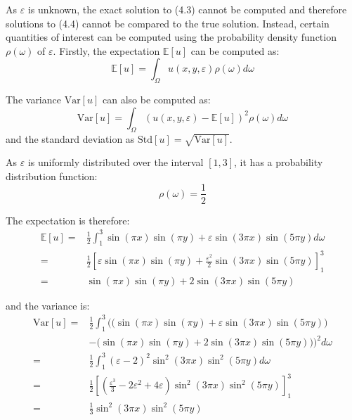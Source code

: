 \documentclass{article}
\numberwithin{equation}{section}
\begin{document}
As $\varepsilon$ is unknown, the exact solution to (4.3) cannot be computed and therefore solutions to (4.4) cannot be compared to the true solution. Instead, certain quantities of interest can be computed using the probability density function $\rho(\omega)$ of $\varepsilon$. Firstly, the expectation $\mathbb{E}[u]$ can be computed as:
\begin{equation}
\mathbb{E}[u] = \int_{\Omega} u(x,y,\varepsilon) \rho(\omega) d \omega
\end{equation}

The variance $\text{Var}[u]$ can also be computed as:
\begin{equation}
\text{Var}[u] = \int_{\Omega} \left(u(x,y,\varepsilon) - \mathbb{E}[u] \right)^2 \rho(\omega) d \omega
\end{equation}
and the standard deviation as $\text{Std}[u] = \sqrt{\text{Var}[u]}$.

As $\varepsilon$ is uniformly distributed over the interval $[1,3]$, it has a probability distribution function:
\begin{equation}
\rho(\omega) = \frac{1}{2}
\end{equation}

The expectation is therefore:
\begin{equation}
\begin{split}
\mathbb{E}[u] = & \frac{1}{2} \int_{1}^3 \sin(\pi x)\sin(\pi y) + \varepsilon \sin(3 \pi x) \sin(5 \pi y) d \omega \\
= & \frac{1}{2} \left[\varepsilon \sin(\pi x) \sin(\pi y) + \frac{\varepsilon^2}{2} \sin(3 \pi x) \sin(5 \pi y)\right]_{1}^{3} \\
= & \sin(\pi x) \sin(\pi y) + 2 \sin(3\pi x)\sin(5\pi y)
\end{split}
\end{equation}

and the variance is:
\begin{equation}
\begin{split}
\text{Var}[u] = & \frac{1}{2} \int_{1}^3 \Big( \big( \sin(\pi x) \sin(\pi y) + \varepsilon \sin(3 \pi x) \sin(5 \pi y) \big) \\
& - \big(\sin(\pi x) \sin(\pi y) + 2\sin(3\pi x)\sin(5\pi y) \big) \Big)^2 d \omega \\
= & \frac{1}{2} \int_{1}^3 (\varepsilon-2)^2 \sin^2 (3 \pi x) \sin^2 (5 \pi y) d \omega \\
= & \frac{1}{2} \left[ \left( \frac{\varepsilon^3}{3}-2\varepsilon^2 + 4\varepsilon \right) \sin^2 (3 \pi x) \sin^2 (5 \pi y) \right]_{1}^3 \\
= & \frac{1}{3} \sin^2 (3 \pi x) \sin^2 (5 \pi y)
\end{split}
\end{equation}
\end{document}
